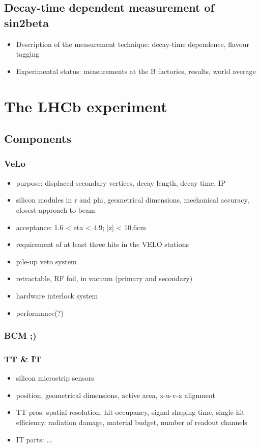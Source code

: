 \section{Decay-time dependent measurement of sin2beta}
\begin{itemize}
  \item Description of the measurement technique: decay-time dependence, flavour tagging
  \item Experimental status: measurements at the B factories, results, world average
\end{itemize}

\chapter{The LHCb experiment}
\section{Components}
\subsection{VeLo}
\begin{itemize}
  \item purpose: displaced secondary vertices, decay length, decay time, IP
  \item silicon modules in r and phi, geometrical dimensions, mechanical accuracy, closest approach to beam
  \item acceptance: 1.6 < eta < 4.9; |z| < 10.6cm
  \item requirement of at least three hits in the VELO stations
  \item pile-up veto system
  \item retractable, RF foil, in vacuum (primary and secondary)
  \item hardware interlock system
  \item performance(?)
\end{itemize}
\subsection{BCM ;)}
\subsection{TT \& IT}
\begin{itemize}
  \item silicon microstrip sensors
  \item position, geometrical dimensions, active area, x-u-v-x alignment
  \item TT pros: spatial resolution, hit occupancy, signal shaping time, single-hit efficiency, radiation damage, material budget, number of readout channels
  \item IT parts: ...
\end{itemize}

